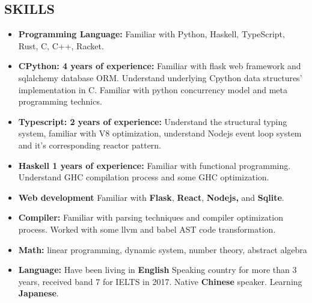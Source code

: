 \documentclass{res}
\begin{document}
\begin{resume}
\section{SKILLS}
    \begin{itemize}[leftmargin=-.2in]
        \setlength\itemsep{-1em}
        \item \textbf{Programming Language:} Familiar with Python, Haskell, TypeScript, Rust, C, C++, Racket.\\
        \item \textbf{CPython: 4 years of experience:} Familiar with flask web framework and sqlalchemy database ORM. Understand underlying Cpython data structures' implementation in C. Familiar with python concurrency model and meta programming technics. \\
        \item \textbf{Typescript: 2 years of experience:} Understand the structural typing system, familiar with V8 optimization, understand Nodejs event loop system and it's corresponding reactor pattern. \\
        \item \textbf{Haskell 1 years of experience:} Familiar with functional programming. Understand GHC compilation process and some GHC optimization. \\
        \item \textbf{Web development} Familiar with \textbf{Flask}, \textbf{React},\textbf{ Nodejs,} and \textbf{Sqlite}. \\
        \item \textbf{Compiler:} Familiar with parsing techniques and compiler optimization process. Worked with some llvm and babel AST code transformation. \\
        \item \textbf{Math:} linear programming, dynamic system, number theory, abstract algebra \\
        \item \textbf{Language:} Have been living in \textbf{English} Speaking country for more than 3 years, received band 7 for IELTS in 2017. Native \textbf{Chinese} speaker. Learning \textbf{Japanese}.
    \end{itemize}

\end{resume}
\end{document}
